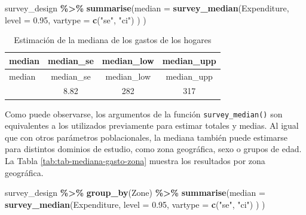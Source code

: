 \documentclass[
  spanish,
  12pt,
]{book}
\newenvironment{Shaded}{\begin{snugshade}}{\end{snugshade}}
\newcommand{\AttributeTok}[1]{\textcolor[rgb]{0.13,0.29,0.53}{#1}}
\newcommand{\FloatTok}[1]{\textcolor[rgb]{0.00,0.00,0.81}{#1}}
\newcommand{\FunctionTok}[1]{\textcolor[rgb]{0.13,0.29,0.53}{\textbf{#1}}}
\newcommand{\NormalTok}[1]{#1}
\newcommand{\SpecialCharTok}[1]{\textcolor[rgb]{0.81,0.36,0.00}{\textbf{#1}}}
\newcommand{\StringTok}[1]{\textcolor[rgb]{0.31,0.60,0.02}{#1}}
\begin{document}
\begin{Shaded}
\begin{Highlighting}[]
\NormalTok{survey\_design }\SpecialCharTok{\%\textgreater{}\%}
  \FunctionTok{summarise}\NormalTok{(}\AttributeTok{median =} \FunctionTok{survey\_median}\NormalTok{(Expenditure,}
                                    \AttributeTok{level =} \FloatTok{0.95}\NormalTok{,}
                                    \AttributeTok{vartype =} \FunctionTok{c}\NormalTok{(}\StringTok{"se"}\NormalTok{, }\StringTok{"ci"}\NormalTok{)}
\NormalTok{                                    )}
\NormalTok{            )}
\end{Highlighting}
\end{Shaded}

\begin{longtable}[]{@{}lccc@{}}
\caption{\label{tab:tab-mediana-gasto}Estimación de la mediana de los gastos de los hogares}\tabularnewline
\toprule\noalign{}
median & median\_se & median\_low & median\_upp \\
\midrule\noalign{}
\endfirsthead
\toprule\noalign{}
median & median\_se & median\_low & median\_upp \\
\midrule\noalign{}
\endhead
\bottomrule\noalign{}
\endlastfoot
298 & 8.82 & 282 & 317 \\
\end{longtable}

Como puede observarse, los argumentos de la función \texttt{survey\_median()} son equivalentes a los utilizados previamente para estimar totales y medias. Al igual que con otros parámetros poblacionales, la mediana también puede estimarse para distintos dominios de estudio, como zona geográfica, sexo o grupos de edad. La Tabla \ref{tab:tab-mediana-gasto-zona} muestra los resultados por zona geográfica.

\begin{Shaded}
\begin{Highlighting}[]
\NormalTok{survey\_design }\SpecialCharTok{\%\textgreater{}\%}
  \FunctionTok{group\_by}\NormalTok{(Zone) }\SpecialCharTok{\%\textgreater{}\%}
  \FunctionTok{summarise}\NormalTok{(}\AttributeTok{median =} \FunctionTok{survey\_median}\NormalTok{(Expenditure,}
                                    \AttributeTok{level =} \FloatTok{0.95}\NormalTok{,}
                                    \AttributeTok{vartype =} \FunctionTok{c}\NormalTok{(}\StringTok{"se"}\NormalTok{, }\StringTok{"ci"}\NormalTok{)}
\NormalTok{                                    )}
\NormalTok{            )}
\end{Highlighting}
\end{Shaded}
\end{document}
